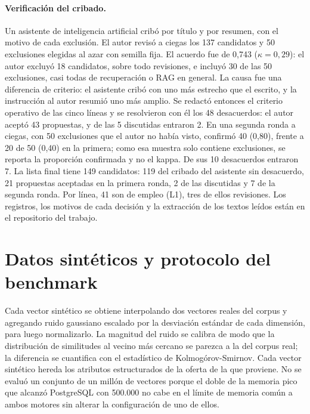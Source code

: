 \paragraph{Verificación del cribado.} Un asistente de inteligencia artificial cribó por título y por resumen, con el motivo de cada exclusión. El autor revisó a ciegas los 137 candidatos y 50 exclusiones elegidas al azar con semilla fija. El acuerdo fue de 0,743 ($\kappa = 0{,}29$): el autor excluyó 18 candidatos, sobre todo revisiones, e incluyó 30 de las 50 exclusiones, casi todas de recuperación o RAG en general. La causa fue una diferencia de criterio: el asistente cribó con uno más estrecho que el escrito, y la instrucción al autor resumió uno más amplio. Se redactó entonces el criterio operativo de las cinco líneas y se resolvieron con él los 48 desacuerdos: el autor aceptó 43 propuestas, y de las 5 discutidas entraron 2. En una segunda ronda a ciegas, con 50 exclusiones que el autor no había visto, confirmó 40 (0,80), frente a 20 de 50 (0,40) en la primera; como esa muestra solo contiene exclusiones, se reporta la proporción confirmada y no el kappa. De sus 10 desacuerdos entraron 7. La lista final tiene 149 candidatos: 119 del cribado del asistente sin desacuerdo, 21 propuestas aceptadas en la primera ronda, 2 de las discutidas y 7 de la segunda ronda. Por línea, 41 son de empleo (L1), tres de ellos revisiones. Los registros, los motivos de cada decisión y la extracción de los textos leídos están en el repositorio del trabajo.

\section{Datos sintéticos y protocolo del benchmark}
\label{anx:sinteticos}

Cada vector sintético se obtiene interpolando dos vectores reales del corpus y agregando ruido gaussiano escalado por la desviación estándar de cada dimensión, para luego normalizarlo. La magnitud del ruido se calibra de modo que la distribución de similitudes al vecino más cercano se parezca a la del corpus real; la diferencia se cuantifica con el estadístico de Kolmogórov-Smirnov. Cada vector sintético hereda los atributos estructurados de la oferta de la que proviene. No se evaluó un conjunto de un millón de vectores porque el doble de la memoria pico que alcanzó PostgreSQL con 500.000 no cabe en el límite de memoria común a ambos motores sin alterar la configuración de uno de ellos.


